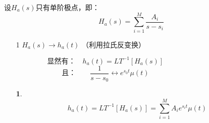 \documentclass[notheorems,compress,mathserif,table]{beamer}
\newtheorem{dablock}{}
\begin{document}
\begin{frame}[shrink]\frametitle{}%
\par 设$H_a(s)$只有单阶极点，即：
       $$H_a(s)= \sum_{i=1}^{M}\frac{A_i}{s-s_i}$$
\begin{enumerate}
  \item [1] $H_a(s)\longrightarrow h_a(t)$  （利用拉氏反变换）

        $$\mbox{显然有：}\quad h_a(t) = LT^{-1}[H_a(s)] \quad\quad\quad\quad\quad\quad\quad\quad\quad$$
        $$
        \mbox{且：}\quad\quad \frac{1}{s-s_0}\longleftrightarrow e^{s_{0}t}\mu(t)\quad
        \quad\quad\quad\quad\quad\quad\quad\quad$$
        \begin{dablock}
        $$h_a(t) = LT^{-1}[H_a(s)]= \sum_{i=1}^{M}A_{i}e^{s_{i}t}\mu(t)$$
        \end{dablock}
\end{enumerate}
\end{frame}
\end{document}
